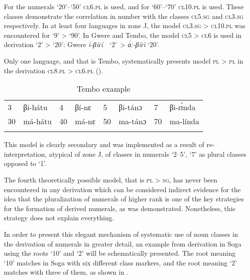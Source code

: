 For the numerals ‘20’–‘50’ \textsc{cl}6.\textsc{pl} is used, and for ‘60’–‘70’ \textsc{cl}10.\textsc{pl} is used. These classes demonstrate the correlation in number with the classes \textsc{cl}5.\textsc{sg} and \textsc{cl}3.\textsc{sg} respectively. In at least four languages in zone J, the model \textsc{cl}3.\textsc{sg} > \textsc{cl}10.\textsc{pl} was encountered for ‘9’ > ‘90’. In Gwere and Tembo, the model \textsc{cl}5 > \textsc{cl}6 is used in derivation ‘2’ > ‘20’: Gwere \textit{ì-β}\textit{íɾí}~~‘2’~>  \textit{{\`{ɑ}}ː-β}\textit{íɾì} ‘20’. 

Only one language, and that is Tembo, systematically presents model \textsc{pl} > \textsc{pl} in the derivation \textsc{cl}8.\textsc{pl}  > \textsc{cl}6.\textsc{pl} ().


\begin{table}
\caption{\label{tab:1:24} Tembo example}

\begin{tabularx}{\textwidth}{lX lX lX lX}
\lsptoprule

3 &  βi-hátu & 4 &  βí-nɛ & 5 &  βi-tánɔ & 7 &  βi-ɾ{\'{ɪ}}nda\\
30 & má-hátu & 40 & má-nɛ & 50 & ma-tánɔ & 70 & ma-línda\\
\lspbottomrule
\end{tabularx}
\end{table}


This model is clearly secondary and was implemented as a result of re-interpretation, atypical of zone J, of classes in numerals ‘2--5’, ‘7’ as plural classes opposed to ‘1’. 

The fourth theoretically possible model, that is \textsc{pl} > \textsc{sg}, has never been encountered in any derivation which can be considered indirect evidence for the idea that the pluralization of numerals of higher rank is one of the key strategies for the formation of derived numerals, as was demonstrated. Nonetheless, this strategy does not explain everything. 

In order to present this elegant mechanism of systematic use of noun classes in the derivation of numerals in greater detail, an example from derivation in Soga using the roots `10' and `2' will be schematically presented. The root meaning `10' matches in Soga with six different class markers, and the root meaning ‘2’ matches with three of them, as shown in . 
 







